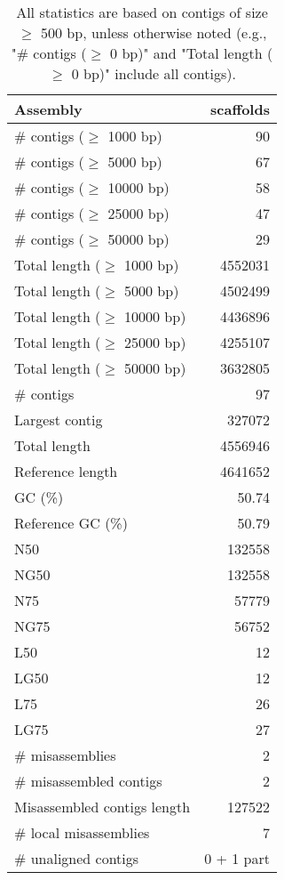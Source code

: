 \documentclass[12pt,a4paper]{article}
\begin{document}
\begin{table}[ht]
\begin{center}
\caption{All statistics are based on contigs of size $\geq$ 500 bp, unless otherwise noted (e.g., "\# contigs ($\geq$ 0 bp)" and "Total length ($\geq$ 0 bp)" include all contigs).}
\begin{tabular}{|l*{1}{|r}|}
\hline
Assembly & scaffolds \\ \hline
\# contigs ($\geq$ 1000 bp) & 90 \\ \hline
\# contigs ($\geq$ 5000 bp) & 67 \\ \hline
\# contigs ($\geq$ 10000 bp) & 58 \\ \hline
\# contigs ($\geq$ 25000 bp) & 47 \\ \hline
\# contigs ($\geq$ 50000 bp) & 29 \\ \hline
Total length ($\geq$ 1000 bp) & 4552031 \\ \hline
Total length ($\geq$ 5000 bp) & 4502499 \\ \hline
Total length ($\geq$ 10000 bp) & 4436896 \\ \hline
Total length ($\geq$ 25000 bp) & 4255107 \\ \hline
Total length ($\geq$ 50000 bp) & 3632805 \\ \hline
\# contigs & 97 \\ \hline
Largest contig & 327072 \\ \hline
Total length & 4556946 \\ \hline
Reference length & 4641652 \\ \hline
GC (\%) & 50.74 \\ \hline
Reference GC (\%) & 50.79 \\ \hline
N50 & 132558 \\ \hline
NG50 & 132558 \\ \hline
N75 & 57779 \\ \hline
NG75 & 56752 \\ \hline
L50 & 12 \\ \hline
LG50 & 12 \\ \hline
L75 & 26 \\ \hline
LG75 & 27 \\ \hline
\# misassemblies & 2 \\ \hline
\# misassembled contigs & 2 \\ \hline
Misassembled contigs length & 127522 \\ \hline
\# local misassemblies & 7 \\ \hline
\# unaligned contigs & 0 + 1 part \\ \hline

\end{tabular}
\end{center}
\end{table}
\end{document}
